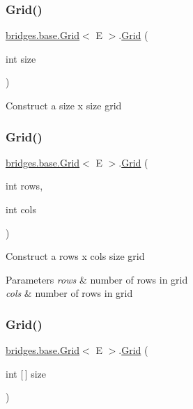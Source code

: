 \subsubsection{\texorpdfstring{Grid()}{Grid()}\hspace{0.1cm}{\footnotesize\ttfamily [2/4]}}
{\footnotesize\ttfamily \mbox{\hyperlink{classbridges_1_1base_1_1_grid}{bridges.\+base.\+Grid}}$<$ E $>$.\mbox{\hyperlink{classbridges_1_1base_1_1_grid}{Grid}} (\begin{DoxyParamCaption}\item[{int}]{size }\end{DoxyParamCaption})}

Construct a size x size grid \mbox{\label{classbridges_1_1base_1_1_grid_a43a699bd7ae2c6c986f978c515ff97d8}} 
\subsubsection{\texorpdfstring{Grid()}{Grid()}\hspace{0.1cm}{\footnotesize\ttfamily [3/4]}}
{\footnotesize\ttfamily \mbox{\hyperlink{classbridges_1_1base_1_1_grid}{bridges.\+base.\+Grid}}$<$ E $>$.\mbox{\hyperlink{classbridges_1_1base_1_1_grid}{Grid}} (\begin{DoxyParamCaption}\item[{int}]{rows,  }\item[{int}]{cols }\end{DoxyParamCaption})}

Construct a rows x cols size grid


\begin{DoxyParams}{Parameters}
{\em rows} & number of rows in grid \\
\hline
{\em cols} & number of rows in grid \\
\hline
\end{DoxyParams}
\mbox{\label{classbridges_1_1base_1_1_grid_ab9975b28d8dda7f3fbe0e35a7a026772}} 
\subsubsection{\texorpdfstring{Grid()}{Grid()}\hspace{0.1cm}{\footnotesize\ttfamily [4/4]}}
{\footnotesize\ttfamily \mbox{\hyperlink{classbridges_1_1base_1_1_grid}{bridges.\+base.\+Grid}}$<$ E $>$.\mbox{\hyperlink{classbridges_1_1base_1_1_grid}{Grid}} (\begin{DoxyParamCaption}\item[{int \mbox{[}$\,$\mbox{]}}]{size }\end{DoxyParamCaption})}

